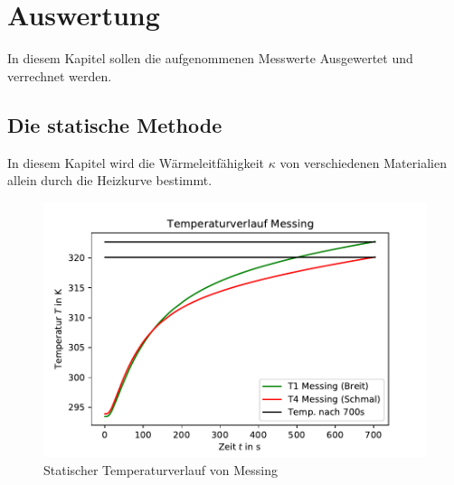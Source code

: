 \section{Auswertung}
In diesem Kapitel sollen die aufgenommenen Messwerte Ausgewertet und verrechnet werden.
\subsection{Die statische Methode}
In diesem Kapitel wird die Wärmeleitfähigkeit $\kappa$ von verschiedenen Materialien allein durch die Heizkurve bestimmt.

\begin{figure}
    \centering
    \includegraphics{statmessing.pdf}
    \caption{Statischer Temperaturverlauf von Messing}
    \label{fig:statmess}
  \end{figure}


